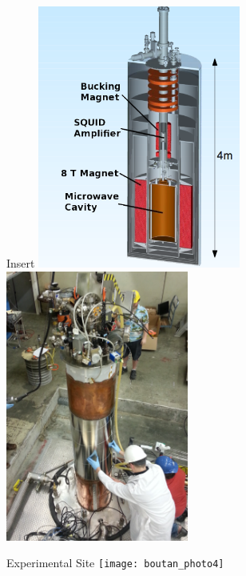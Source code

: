\documentclass{beamer}
\begin{document}
\begin{frame}{Insert}
\includegraphics[width=0.5\textwidth]{admx_schematic} \quad \includegraphics[width=0.45\textwidth]{lowering_insert}

\end{frame}

\begin{frame}{Experimental Site}
\texttt{[image: boutan\_photo4]}
\end{frame}

%



%
\end{document}

